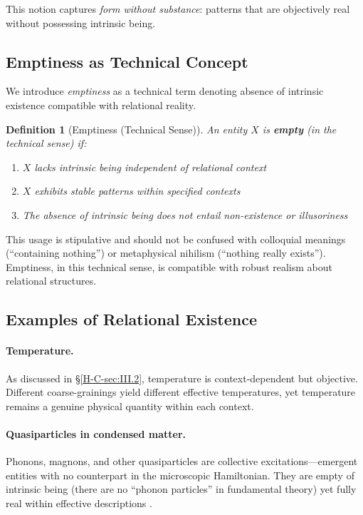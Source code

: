 \documentclass[12pt,a4paper,openany]{book}
\newtheorem{definition}[theorem]{Definition}
\begin{document}
This notion captures \emph{form without substance}: patterns that are objectively real without possessing intrinsic being.

\subsection{Emptiness as Technical Concept}
\label{H-C-sec:III.3}

We introduce \emph{emptiness} as a technical term denoting absence of intrinsic existence compatible with relational reality.

\begin{definition}[Emptiness (Technical Sense)]
\label{H-C-def:emptiness-technical}
An entity $X$ is \textbf{empty} (in the technical sense) if:
\begin{enumerate}
\item $X$ lacks intrinsic being independent of relational context
\item $X$ exhibits stable patterns within specified contexts
\item The absence of intrinsic being does not entail non-existence or illusoriness
\end{enumerate}
\end{definition}

This usage is stipulative and should not be confused with colloquial meanings (``containing nothing'') or metaphysical nihilism (``nothing really exists''). Emptiness, in this technical sense, is compatible with robust realism about relational structures.

\subsection{Examples of Relational Existence}
\label{H-C-sec:III.4}

\paragraph{Temperature.}
As discussed in \S\ref{H-C-sec:III.2}, temperature is context-dependent but objective. Different coarse-grainings yield different effective temperatures, yet temperature remains a genuine physical quantity within each context.

\paragraph{Quasiparticles in condensed matter.}
Phonons, magnons, and other quasiparticles are collective excitations—emergent entities with no counterpart in the microscopic Hamiltonian. They are empty of intrinsic being (there are no ``phonon particles'' in fundamental theory) yet fully real within effective descriptions \cite{Ladyman2007}.
\end{document}
